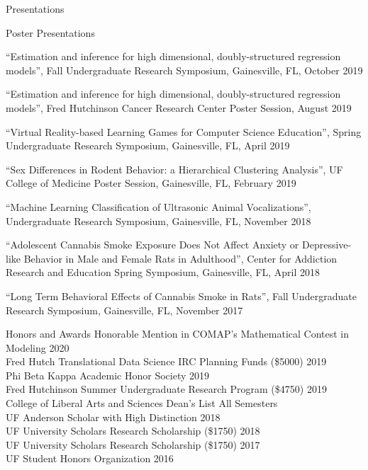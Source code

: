 \documentclass{resume}
\begin{document}
\begin{rSection}{Presentations}
  \begin{rSubsection}{Poster Presentations}{}{}{} %
    \item ``Estimation and inference for high dimensional,
      doubly-structured regression models'', Fall Undergraduate
      Research Symposium, Gainesville, FL, October 2019
    \item  ``Estimation and inference for high dimensional,
      doubly-structured regression models'', Fred Hutchinson Cancer Research Center Poster Session, August 2019
      \item ``Virtual Reality-based Learning Games for Computer Science Education'', Spring Undergraduate Research Symposium, Gainesville, FL, April 2019 
      \item ``Sex Differences in Rodent Behavior: a Hierarchical Clustering Analysis'', UF College of Medicine Poster Session, Gainesville, FL, February 2019
      \item ``Machine Learning Classification of Ultrasonic Animal Vocalizations'', Undergraduate Research Symposium, Gainesville, FL, November 2018
      \item ``Adolescent Cannabis Smoke Exposure Does Not Affect
        Anxiety or Depressive-like Behavior in Male and Female Rats in
        Adulthood'', Center for Addiction Research and Education Spring Symposium, Gainesville, FL, April 2018
      \item``Long Term Behavioral Effects of Cannabis Smoke in Rats'',
        Fall Undergraduate Research Symposium, Gainesville, FL, November 2017
  \end{rSubsection}
  \end{rSection}

  \begin{rSection}{Honors and Awards}
  Honorable Mention in COMAP's Mathematical
  Contest in Modeling \hfill 2020 \\
  Fred Hutch Translational Data Science IRC Planning Funds (\$5000) \hfill 2019 \\
  Phi Beta Kappa Academic Honor Society \hfill 2019 \\
  Fred Hutchinson Summer Undergraduate Research Program (\$4750) \hfill 2019 \\
  College of Liberal Arts and Sciences Dean's List \hfill All Semesters \\
  UF Anderson Scholar with High Distinction \hfill 2018 \\
  UF University Scholars Research Scholarship (\$1750) \hfill 2018 \\
  UF University Scholars Research Scholarship (\$1750) \hfill 2017 \\
  UF Student Honors Organization \hfill 2016 
 \end{rSection}
\end{document}
